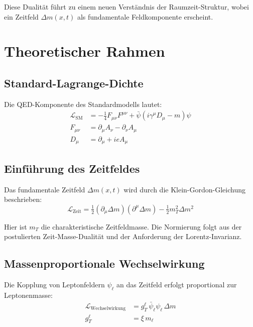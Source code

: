 \documentclass[12pt,a4paper]{article}
\theoremstyle{definition}
\begin{document}
	Diese Dualität führt zu einem neuen Verständnis der Raumzeit-Struktur, wobei ein Zeitfeld $\Delta m(x,t)$ als fundamentale Feldkomponente erscheint\cite{pascher_lagrangian_extended_2025}.
	
	\section{Theoretischer Rahmen}
	
	\subsection{Standard-Lagrange-Dichte}
	
	Die QED-Komponente des Standardmodells lautet:
	\begin{align}
		\mathcal{L}_{\text{SM}} &= -\tfrac{1}{4} F_{\mu\nu}F^{\mu\nu} + \bar{\psi}(i\gamma^\mu D_\mu - m)\psi \label{eq:sm_lagrangian}\\
		F_{\mu\nu} &= \partial_\mu A_\nu - \partial_\nu A_\mu \label{eq:field_tensor}\\
		D_\mu &= \partial_\mu + ieA_\mu \label{eq:covariant_derivative}
	\end{align}
	
	\subsection{Einführung des Zeitfeldes}
	
	Das fundamentale Zeitfeld $\Delta m(x,t)$ wird durch die Klein-Gordon-Gleichung beschrieben:
	\begin{equation}
		\mathcal{L}_{\text{Zeit}} = \tfrac{1}{2}(\partial_\mu \Delta m)(\partial^\mu \Delta m) - \tfrac{1}{2} m_T^2 \Delta m^2
		\label{eq:time_field_lagrangian}
	\end{equation}
	
	Hier ist $m_T$ die charakteristische Zeitfeldmasse. Die Normierung folgt aus der postulierten Zeit-Masse-Dualität und der Anforderung der Lorentz-Invarianz\cite{pascher_mathematical_structure_2025}.
	
	\subsection{Massenproportionale Wechselwirkung}
	
	Die Kopplung von Leptonfeldern $\psi_\ell$ an das Zeitfeld erfolgt proportional zur Leptonenmasse:
	\begin{align}
		\mathcal{L}_{\text{Wechselwirkung}} &= g_T^\ell \, \bar{\psi}_\ell \psi_\ell \, \Delta m \label{eq:interaction_lagrangian}\\
		g_T^\ell &= \xi \, m_\ell \label{eq:coupling_strength}
	\end{align}
	
\end{document}
